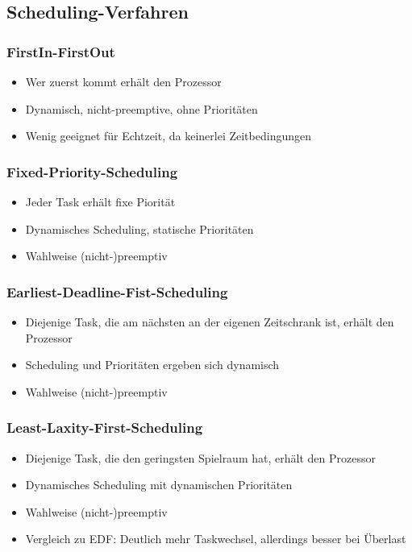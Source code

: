 \subsection{Scheduling-Verfahren}

\subsubsection{FirstIn-FirstOut}
\begin{itemize}
	\item Wer zuerst kommt erhält den Prozessor
	\item Dynamisch, nicht-preemptive, ohne Prioritäten
	\item Wenig geeignet für Echtzeit, da keinerlei Zeitbedingungen
\end{itemize}

\subsubsection{Fixed-Priority-Scheduling}
\begin{itemize}
	\item Jeder Task erhält fixe Piorität
	\item Dynamisches Scheduling, statische Prioritäten
	\item Wahlweise (nicht-)preemptiv
\end{itemize}

\subsubsection{Earliest-Deadline-Fist-Scheduling}
\begin{itemize}
	\item Diejenige Task, die am nächsten an der eigenen Zeitschrank ist, erhält den Prozessor
	\item Scheduling und Prioritäten ergeben sich dynamisch
	\item Wahlweise (nicht-)preemptiv
\end{itemize}

\subsubsection{Least-Laxity-First-Scheduling}
\begin{itemize}
	\item Diejenige Task, die den geringsten Spielraum hat, erhält den Prozessor
	\item Dynamisches Scheduling mit dynamischen Prioritäten
	\item Wahlweise (nicht-)preemptiv
	\item Vergleich zu EDF: Deutlich mehr Taskwechsel, allerdings besser bei Überlast
\end{itemize}


